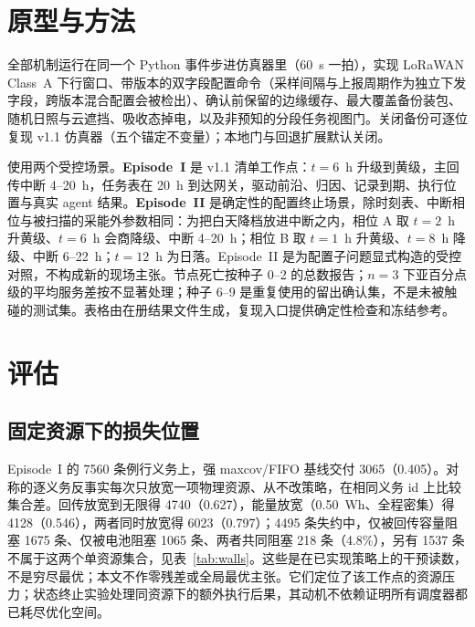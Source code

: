 \documentclass[11pt]{article}
\begin{document}
\section{原型与方法}
\label{sec:proto}

全部机制运行在同一个 Python 事件步进仿真器里（60~s 一拍），实现 LoRaWAN Class~A 下行窗口、带版本的双字段配置命令（采样间隔与上报周期作为独立下发字段，跨版本混合配置会被检出）、确认前保留的边缘缓存、最大覆盖备份装包、随机日照与云遮挡、吸收态掉电，以及非预知的分段任务视图门。关闭备份可逐位复现 v1.1 仿真器（五个锚定不变量）；本地门与回退扩展默认关闭。

使用两个受控场景。\textbf{Episode~I} 是 v1.1 清单工作点：$t{=}6$~h 升级到黄级，主回传中断 4--20~h，任务表在 20~h 到达网关，驱动前沿、归因、记录到期、执行位置与真实 agent 结果。\textbf{Episode~II} 是确定性的配置终止场景，除时刻表、中断相位与被扫描的采能外参数相同：为把白天降档放进中断之内，相位 A 取 $t{=}2$~h 升黄级、$t{=}6$~h 会商降级、中断 4--20~h；相位 B 取 $t{=}1$~h 升黄级、$t{=}8$~h 降级、中断 6--22~h；$t{=}12$~h 为日落。Episode~II 是为配置子问题显式构造的受控对照，不构成新的现场主张。节点死亡按种子 0--2 的总数报告；$n{=}3$ 下亚百分点级的平均服务差按不显著处理；种子 6--9 是重复使用的留出确认集，不是未被触碰的测试集。表格由在册结果文件生成，复现入口提供确定性检查和冻结参考。

\section{评估}
\label{sec:eval}

\subsection{固定资源下的损失位置}
\label{sec:eval-frontier}
Episode~I 的 7560 条例行义务上，强 maxcov/FIFO 基线交付 3065（0.405）。对称的逐义务反事实每次只放宽一项物理资源、从不改策略，在相同义务 id 上比较集合差。回传放宽到无限得 4740（0.627），能量放宽（0.50~Wh、全程密集）得 4128（0.546），两者同时放宽得 6023（0.797）；4495 条失约中，仅被回传容量阻塞 1675 条、仅被电池阻塞 1065 条、两者共同阻塞 218 条（4.8\%），另有 1537 条不属于这两个单资源集合，见表~\ref{tab:walls}。这些是在已实现策略上的干预读数，不是穷尽最优；本文不作零残差或全局最优主张。它们定位了该工作点的资源压力；状态终止实验处理同资源下的额外执行后果，其动机不依赖证明所有调度器都已耗尽优化空间。

\begin{table}[t]
\centering\small
\caption{7560 条义务上的反事实干预（Episode~I）。在已测配置上的集合分解，不是全部合法策略的上界。}
\label{tab:walls}

\end{table}
\end{document}
